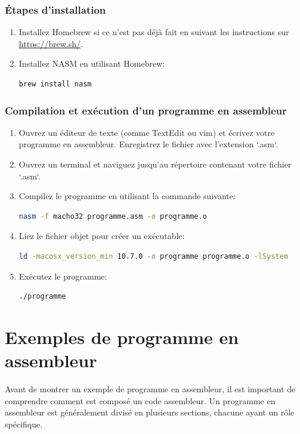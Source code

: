 \documentclass[a4paper, 12pt]{report}
\begin{document}
\subsection{Étapes d'installation}
\begin{enumerate}
  \item Installez Homebrew si ce n'est pas déjà fait en suivant les instructions sur \url{https://brew.sh/}.
  \item Installez NASM en utilisant Homebrew:
  \begin{lstlisting}[language=bash]
  brew install nasm
  \end{lstlisting}
\end{enumerate}

\subsection{Compilation et exécution d'un programme en assembleur}
\begin{enumerate}
  \item Ouvrez un éditeur de texte (comme TextEdit ou vim) et écrivez votre programme en assembleur. Enregistrez le fichier avec l'extension `.asm`.
  \item Ouvrez un terminal et naviguez jusqu'au répertoire contenant votre fichier `.asm`.
  \item Compilez le programme en utilisant la commande suivante:
  \begin{lstlisting}[language=bash]
  nasm -f macho32 programme.asm -o programme.o
  \end{lstlisting}
  \item Liez le fichier objet pour créer un exécutable:
  \begin{lstlisting}[language=bash]
  ld -macosx_version_min 10.7.0 -o programme programme.o -lSystem
  \end{lstlisting}
  \item Exécutez le programme:
  \begin{lstlisting}[language=bash]
  ./programme
  \end{lstlisting}
\end{enumerate}



\chapter{Exemples de programme en assembleur}
Avant de montrer un exemple de programme en assembleur, il est important de comprendre comment est composé un code assembleur. Un programme en assembleur est généralement divisé en plusieurs sections, chacune ayant un rôle spécifique.
\end{document}
